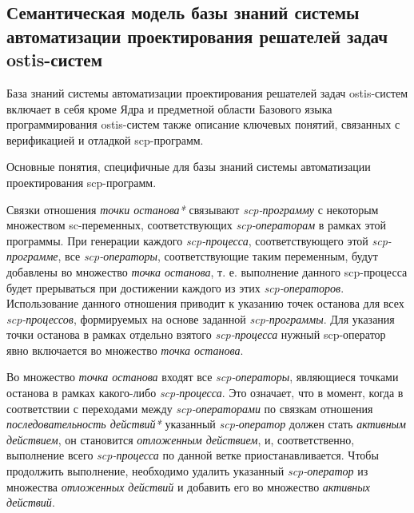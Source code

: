 \subsection{Семантическая модель базы знаний системы автоматизации проектирования решателей задач ostis-систем}

База знаний системы автоматизации проектирования решателей задач ostis-систем включает в себя кроме Ядра и предметной области Базового языка программирования ostis-систем также описание ключевых понятий, связанных с верификацией и отладкой scp-программ.

Основные понятия, специфичные для базы знаний системы автоматизации проектирования scp-программ.
\begin{SCn}
\end{SCn}

Связки отношения \textit{точки останова*} связывают \textit{scp-программу} с некоторым множеством sc-переменных, соответствующих \textit{scp-операторам} в рамках этой программы. При генерации каждого \textit{scp-процесса}, соответствующего этой \textit{scp-программе}, все \textit{scp-операторы}, соответствующие таким переменным, будут добавлены во множество \textit{точка останова}, т. е. выполнение данного scp-процесса будет прерываться при достижении каждого из этих \textit{scp-операторов}.
Использование данного отношения приводит к указанию точек останова для всех \textit{scp-процессов}, формируемых на основе заданной \textit{\mbox{scp-программы}}. Для указания точки останова в рамках отдельно взятого \textit{scp-процесса} нужный scp-оператор явно включается во множество \textit{точка останова}.

\begin{SCn}
\end{SCn}

Во множество \textit{точка останова} входят все \textit{scp-операторы}, являющиеся точками останова в рамках какого-либо \textit{scp-процесса}. Это означает, что в момент, когда в соответствии с переходами между \textit{scp-операторами} по связкам отношения \textit{последовательность действий*} указанный \textit{scp-оператор} должен стать \textit{активным действием}, он становится \textit{отложенным действием}, и, соответственно, выполнение всего \textit{scp-процесса} по данной ветке приостанавливается. Чтобы продолжить выполнение, необходимо удалить указанный \textit{\mbox{scp-оператор}} из множества \textit{отложенных действий} и добавить его во множество \textit{активных действий}.

